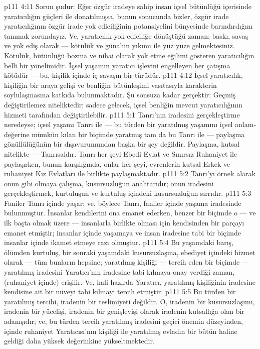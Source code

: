 \vs p111 4:11 Sorun şudur: Eğer özgür iradeye sahip insan içsel bütünlüğü içerisinde yaratıcılığın güçleri ile donatılmışsa, bunun sonucunda bizler, özgür irade yaratıcılığının özgür irade yok ediciliğinin potansiyelini bünyesinde barındırdığını tanımak zorundayız. Ve, yaratıcılık yok ediciliğe dönüştüğü zaman; baskı, savaş ve yok ediş olarak --- kötülük ve günahın yıkımı ile yüz yüze gelmektesiniz. Kötülük, bütünlüğü bozma ve nihai olarak yok etme eğilimi gösteren yaratıcılığın belli bir yönelimidir. İçsel yaşamın yaratıcı işlevini engelleyen her çatışma kötüdür --- bu, kişilik içinde iç savaşın bir türüdür.
\vs p111 4:12 İçsel yaratıcılık, kişiliğin bir araya gelişi ve benliğin bütünleşimi vasıtasıyla karakterin soylulaşmasına katkıda bulunmaktadır. Şu sonsuza kadar gerçektir: Geçmiş değiştirilemez niteliktedir; sadece gelecek, içsel benliğin mevcut yaratıcılığının hizmeti tarafından değiştirilebilir.
\vs p111 5:1 Tanrı’nın iradesini gerçekleştirme neredeyse; içsel yaşamı Tanrı ile --- bu türden bir yaratılmış yaşamını içsel anlam\hyp{}değerine mümkün kılan bir biçimde yaratmış tam da bu Tanrı ile --- paylaşma gönüllülüğünün bir dışavurumundan başka bir şey değildir. Paylaşma, kutsal nitelikte --- Tanrısaldır. Tanrı her şeyi Ebedi Evlat ve Sınırsız Ruhaniyet ile paylaşırken, bunun karşılığında, onlar her şeyi, evrenlerin kutsal Erkek ve ruhaniyet Kız Evlatları ile birlikte paylaşmaktadır.
\vs p111 5:2 Tanrı’yı örnek alarak onun gibi olmaya çalışma, kusursuzluğun anahtarıdır; onun iradesini gerçekleştirmek, kurtuluşun ve kurtuluş içindeki kusursuzluğun sırrıdır.
\vs p111 5:3 Faniler Tanrı içinde yaşar; ve, böylece Tanrı, faniler içinde yaşama iradesinde bulunmuştur. İnsanlar kendilerini ona emanet ederken, benzer bir biçimde o --- ve ilk başta olmak üzere --- insanlarla birlikte olması için kendisinden bir parçayı emanet etmiştir; insanlar içinde yaşamaya ve insan iradesine tabi bir biçimde insanlar içinde ikamet etmeye razı olmuştur.
\vs p111 5:4 Bu yaşamdaki barış, ölümden kurtuluş, bir sonraki yaşamdaki kusursuzlaşma, ebediyet içindeki hizmet olarak --- tüm bunların hepsine; yaratılmış kişiliği --- tercih eden bir biçimde --- yaratılmış iradesini Yaratıcı’nın iradesine tabi kılmaya onay verdiği zaman,  (ruhaniyet içinde) erişilir. Ve, hali hazırda Yaratıcı, yaratılmış kişiliğinin iradesine kendisine ait bir nüveyi tabi kılmayı tercih etmiştir.
\vs p111 5:5 Bu türden bir yaratılmış tercihi, iradenin bir teslimiyeti değildir. O, iradenin bir kusursuzlaşımı, iradenin bir yücelişi, iradenin bir genişleyişi olarak iradenin kutsallığa olan bir adanışıdır; ve, bu türden tercih yaratılmış iradesini geçici önemin düzeyinden, içinde ruhaniyet Yaratıcısı’nın kişiliği ile yaratılmış evladın bir bütün haline geldiği daha yüksek değerinkine yükseltmektedir.
